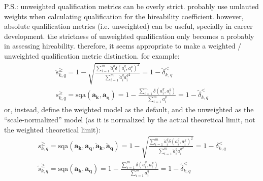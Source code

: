 \documentclass{elsarticle} %
\begin{document}
P.S.: unweighted qualification metrics can be overly strict. probably use
umlauted weights when calculating qualification for the hireability
coefficient. however, absolute qualification metrics (i.e. unweighted) can be
useful, specially in career development. the strictness of unweighted
qualification only becomes a probably in assessing hireability. therefore, it
seems appropriate to make a weighted / unweighted qualification metric
distinction. for example:
\begin{gather}
    \ddot{s}_{k,q}^{\geq} =
    1 -
    \sqrt{
    \frac{
    \sum_{i=1}^{m}{
    \ddot{a}_{i}^{q} {\delta(a_{i}^{q}, a_{i}^{k})} ^ 2
    }
    }{
    \sum_{i=1}^{m}{
    \ddot{a}_{i}^{q} {a_{i}^{q}} ^ 2
    }
    }
    } =
    1 - \ddot{\delta}_{k,q}^{<}
    \\
    s_{k,q}^{\geq} =
    \text{sqa}(\boldsymbol{a_k}, \boldsymbol{a_q}) =
    1 -
    \frac{
    \sum_{i=1}^{m}{
    {\delta(a_{i}^{q}, a_{i}^{k})}
    }
    }{
    \sum_{i=1}^{m}{
    a_{i}^{q}
    }
    } =
    1 - \tilde{\delta}_{k,q}^{<}
\end{gather}
or, instead, define the weighted model as the default, and the unweighted as the ``scale-normalized'' model (as it is normalized by the actual theoretical limit, not the weighted theoretical limit):
\begin{gather}
    s_{k,q}^{\geq} =
    \text{sqa}(\boldsymbol{a_k}, \boldsymbol{a_q}, \boldsymbol{\ddot{a}_k}, \boldsymbol{\ddot{a}_q}) =
    1 -
    \sqrt{
    \frac{
    \sum_{i=1}^{m}{
    \ddot{a}_{i}^{q} {\delta(a_{i}^{q}, a_{i}^{k})} ^ 2
    }
    }{
    \sum_{i=1}^{m}{
    \ddot{a}_{i}^{q} {a_{i}^{q}} ^ 2
    }
    }
    } =
    1 - \delta_{k,q}^{<}
    \\
    \tilde{s}_{k,q}^{\geq} =
    \text{sqa}(\boldsymbol{a_k}, \boldsymbol{a_q}) =
    1 -
    \frac{
    \sum_{i=1}^{m}{
    {\delta(a_{i}^{q}, a_{i}^{k})}
    }
    }{
    \sum_{i=1}^{m}{
    a_{i}^{q}
    }
    } =
    1 - \tilde{\delta}_{k,q}^{<}
\end{gather}
\end{document}

